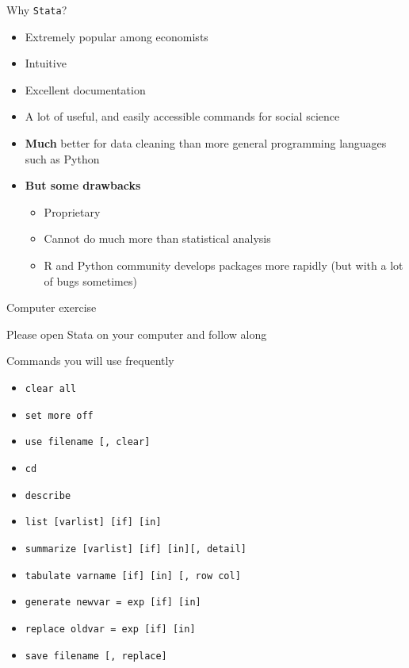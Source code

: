 \documentclass[aspectratio=169, 11pt]{beamer}
\begin{document}
\begin{frame}{Why \texttt{Stata}?}

    \begin{itemize}[<+- | alert@+>]
        \item Extremely popular among economists
        \item Intuitive
        \item Excellent documentation
        \item A lot of useful, and easily accessible commands for social science
        \item \textbf{Much} better for data cleaning than more general programming languages such as Python
        \item \textbf{But some drawbacks}
\begin{itemize}
    \item Proprietary
    \item Cannot do much more than statistical analysis
    \item R and Python community develops packages more rapidly (but with a lot of bugs sometimes)
\end{itemize}
    \end{itemize}
    
\vspace{0.5cm}


\end{frame}

\begin{frame}{Computer exercise}

\begin{center}
    Please open Stata on your computer and follow along
\end{center}
    
\end{frame}

\begin{frame}{Commands you will use frequently}

\begin{itemize}
    \item \texttt{clear all}
\item \texttt{set more off}
\item \texttt{use filename [, clear]}
\item \texttt{cd}
\item \texttt{describe}
\item \texttt{list [varlist] [if] [in]}
\item \texttt{summarize [varlist] [if] [in][, detail]}
\item \texttt{tabulate varname [if] [in] [, row col]}
\item \texttt{generate newvar = exp [if] [in]}
\item \texttt{replace oldvar = exp [if] [in]}
\item \texttt{save filename [, replace]}

\end{itemize}

\end{frame}
\end{document}
